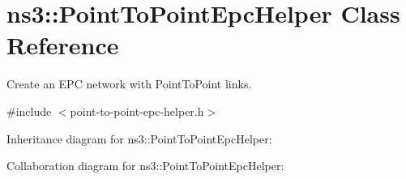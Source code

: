 \hypertarget{classns3_1_1PointToPointEpcHelper}{}\section{ns3\+:\+:Point\+To\+Point\+Epc\+Helper Class Reference}
\label{classns3_1_1PointToPointEpcHelper}


Create an E\+PC network with Point\+To\+Point links.  




{\ttfamily \#include $<$point-\/to-\/point-\/epc-\/helper.\+h$>$}



Inheritance diagram for ns3\+:\+:Point\+To\+Point\+Epc\+Helper\+:


Collaboration diagram for ns3\+:\+:Point\+To\+Point\+Epc\+Helper\+:
